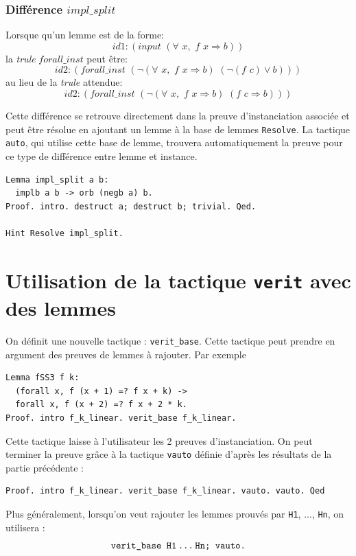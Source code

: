 \documentclass[11pt]{article}
\begin{document}
\subsubsection{Différence $impl\_split$}

Lorsque qu'un lemme est de la forme:
\[ id1:(input \,\,(\forall\,\, x,\,\, f \,\,x \Rightarrow b)) \]
la \textit{trule} $forall\_inst$ peut être:
\[ id2:(forall\_inst \,\, ( \neg (\forall\,\, x, \,\,f \,\, x \Rightarrow b) \,\,(\neg (f\,\, c) \vee  b))) \]
au lieu de la \textit{trule} attendue:
\[ id2:(forall\_inst  \,\,( \neg (\forall \,\,x,\,\, f\,\, x \Rightarrow b)\,\, (f \,\,c \Rightarrow b))) \]

Cette différence se retrouve directement dans la preuve d'instanciation associée et peut être résolue en ajoutant un lemme à la base de lemmes \texttt{Resolve}. La tactique \texttt{auto}, qui utilise cette base de lemme, trouvera automatiquement la preuve pour ce type de différence entre lemme et instance.

\begin{lstlisting}[frame=single]
Lemma impl_split a b:
  implb a b -> orb (negb a) b.
Proof. intro. destruct a; destruct b; trivial. Qed.

Hint Resolve impl_split.
\end{lstlisting}



\section{Utilisation de la tactique \texttt{verit} avec des lemmes}

On définit une nouvelle tactique : \texttt{verit\_base}. Cette tactique peut prendre en argument des preuves de lemmes à rajouter. Par exemple 
\begin{lstlisting}[frame=single]
Lemma fSS3 f k:
  (forall x, f (x + 1) =? f x + k) ->
  forall x, f (x + 2) =? f x + 2 * k.
Proof. intro f_k_linear. verit_base f_k_linear.
\end{lstlisting}
Cette tactique laisse à l'utilisateur les 2 preuves d'instanciation. On peut terminer la preuve grâce à la tactique \texttt{vauto} définie d'après les résultats de la partie précédente : 
\begin{lstlisting}[frame=single]
Proof. intro f_k_linear. verit_base f_k_linear. vauto. vauto. Qed
\end{lstlisting}
Plus généralement, lorsqu'on veut rajouter les lemmes prouvés par \texttt{H1}, ..., \texttt{Hn}, on utilisera : 
\[\texttt{verit\_base H1\,...\,Hn; vauto.}\]
\end{document}
